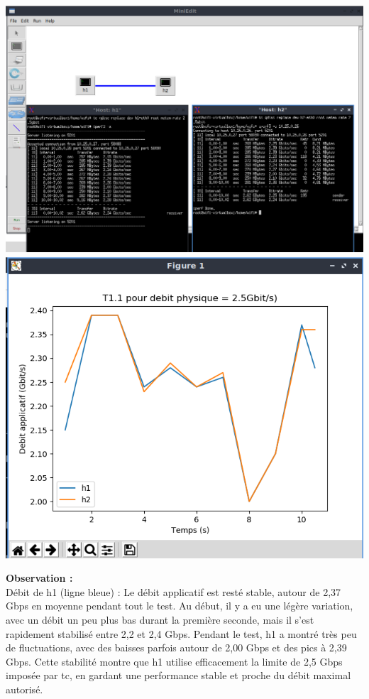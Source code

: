 \begin{center}
    \includegraphics[width=1\textwidth]{./images/T1.1/2500test1.png}
    \includegraphics[width=1\textwidth]{./images/T1.1/courbe2500test1.png}
\end{center}
\textbf{Observation :}\\
Débit de h1 (ligne bleue) :  Le débit applicatif est resté stable, autour de 2,37 Gbps en moyenne pendant tout le test. Au début, il y a eu une légère variation, avec un débit un peu plus bas durant la première seconde, mais il s’est rapidement stabilisé entre 2,2 et 2,4 Gbps. Pendant le test, h1 a montré très peu de fluctuations, avec des baisses parfois autour de 2,00 Gbps et des pics à 2,39 Gbps. Cette stabilité montre que h1 utilise efficacement la limite de 2,5 Gbps imposée par tc, en gardant une performance stable et proche du débit maximal autorisé.
